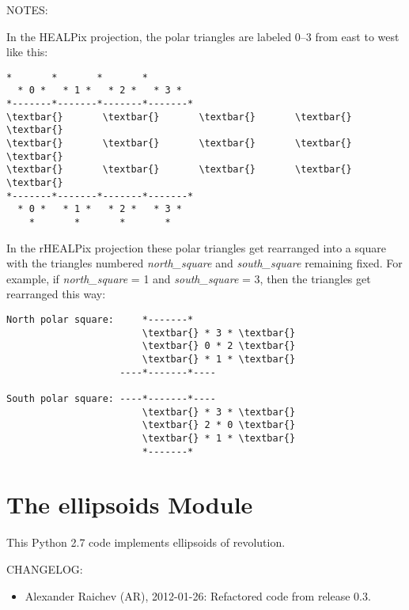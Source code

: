 \documentclass[a4paper,12ptopenany,oneside]{sphinxmanual}
\begin{document}
\begin{fulllineitems}
NOTES:

In the HEALPix projection, the polar triangles are labeled 0--3 from 
east to west like this:

\begin{Verbatim}[commandchars=\\\{\}]
    *       *       *       *       
  * 0 *   * 1 *   * 2 *   * 3 *        
*-------*-------*-------*-------*
\textbar{}       \textbar{}       \textbar{}       \textbar{}       \textbar{}
\textbar{}       \textbar{}       \textbar{}       \textbar{}       \textbar{}
\textbar{}       \textbar{}       \textbar{}       \textbar{}       \textbar{}
*-------*-------*-------*-------*
  * 0 *   * 1 *   * 2 *   * 3 *
    *       *       *       *
\end{Verbatim}

In the rHEALPix projection these polar triangles get rearranged
into a square with the triangles numbered \emph{north\_square} and \emph{south\_square} 
remaining fixed.
For example, if \emph{north\_square} = 1 and \emph{south\_square} = 3, 
then the triangles get rearranged this way:

\begin{Verbatim}[commandchars=\\\{\}]
North polar square:     *-------*       
                        \textbar{} * 3 * \textbar{}    
                        \textbar{} 0 * 2 \textbar{}    
                        \textbar{} * 1 * \textbar{}    
                    ----*-------*----
                    
South polar square: ----*-------*----
                        \textbar{} * 3 * \textbar{}
                        \textbar{} 2 * 0 \textbar{}
                        \textbar{} * 1 * \textbar{}
                        *-------*
\end{Verbatim}

\end{fulllineitems}



\chapter{The ellipsoids Module}
\label{ellipsoids:the-ellipsoids-module}\label{ellipsoids::doc}\label{ellipsoids:module-ellipsoids}
This Python 2.7 code implements ellipsoids of revolution.

CHANGELOG:
\begin{itemize}
\item {} 
Alexander Raichev (AR), 2012-01-26: Refactored code from release 0.3.

\end{itemize}
\end{document}

